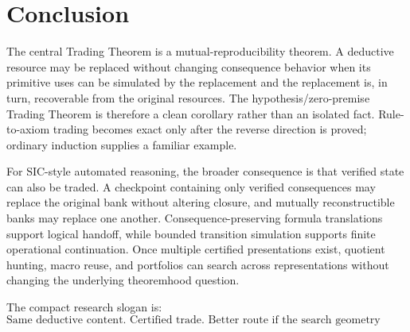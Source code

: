 \documentclass[11pt]{article}
\theoremstyle{definition}
\theoremstyle{remark}
\begin{document}
\section{Conclusion}
The central Trading Theorem is a mutual-reproducibility theorem. A deductive resource may be replaced without changing consequence behavior when its primitive uses can be simulated by the replacement and the replacement is, in turn, recoverable from the original resources. The hypothesis/zero-premise Trading Theorem is therefore a clean corollary rather than an isolated fact. Rule-to-axiom trading becomes exact only after the reverse direction is proved; ordinary induction supplies a familiar example.

For SIC-style automated reasoning, the broader consequence is that verified state can also be traded. A checkpoint containing only verified consequences may replace the original bank without altering closure, and mutually reconstructible banks may replace one another. Consequence-preserving formula translations support logical handoff, while bounded transition simulation supports finite operational continuation. Once multiple certified presentations exist, quotient hunting, macro reuse, and portfolios can search across representations without changing the underlying theoremhood question.

The compact research slogan is:
\[
\boxed{\text{Same deductive content. Certified trade. Better route if the search geometry cooperates.}}
\]
\end{document}
